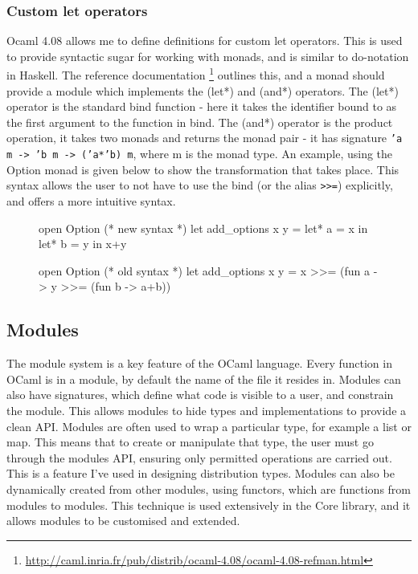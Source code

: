 \subsubsection{Custom let operators}
Ocaml 4.08 allows me to define definitions for custom let operators. This is used to provide syntactic sugar for working with monads, and is similar to do-notation in Haskell. The reference documentation \footnote{\url{http://caml.inria.fr/pub/distrib/ocaml-4.08/ocaml-4.08-refman.html}} outlines this, and a monad should provide a module which implements the (let*) and (and*) operators. The (let*) operator is the standard bind function - here it takes the identifier bound to as the first argument to the function in bind. The (and*) operator is the product operation, it takes two monads and returns the monad pair - it has signature \texttt{'a m -> 'b m -> ('a*'b) m}, where m is the monad type. An example, using the Option monad is given below to show the transformation that takes place. This syntax allows the user to not have to use the bind (or the alias \texttt{>>=}) explicitly, and offers a more intuitive syntax.

\begin{figure}[!htb]
	\centering														
	\begin{minipage}{0.45\textwidth}
		\centering
		\begin{ocamlcode-in}
open Option
(* new syntax *)
let add_options x y = 
  let* a = x in
  let* b = y in
  x+y
		\end{ocamlcode-in}
	\end{minipage}
	\begin{minipage}{0.45\textwidth}
		\centering
\begin{ocamlcode-in}
open Option
(* old syntax *)
let add_options x y = 
  x >>= (fun a -> 
      y >>= (fun b ->
          a+b))
\end{ocamlcode-in}
	\end{minipage}
\end{figure}

\subsection{Modules}
The module system is a key feature of the OCaml language. Every function in OCaml is in a module, by default the name of the file it resides in. Modules can also have signatures, which define what code is visible to a user, and constrain the module. This allows modules to hide types and implementations to provide a clean API. Modules are often used to wrap a particular type, for example a list or map. This means that to create or manipulate that type, the user must go through the modules API, ensuring only permitted operations are carried out. This is a feature I've used in designing distribution types. Modules can also be dynamically created from other modules, using functors, which are functions from modules to modules. This technique is used extensively in the Core library, and it allows modules to be customised and extended.
	
